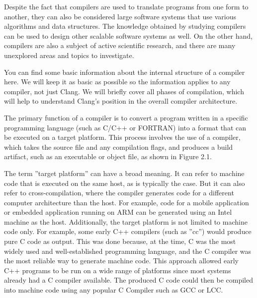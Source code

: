 Despite the fact that compilers are used to translate programs from one form to another, they can also be considered large software systems that use various algorithms and data structures. The knowledge obtained by studying compilers can be used to design other scalable software systems as well. On the other hand, compilers are also a subject of active scientific research, and there are many unexplored areas and topics to investigate.

You can find some basic information about the internal structure of a compiler here. We will keep it as basic as possible so the information applies to any compiler, not just Clang. We will briefly cover all phases of compilation, which will help to understand Clang’s position in the overall compiler architecture.


The primary function of a compiler is to convert a program written in a specific programming language (such as C/C++ or FORTRAN) into a format that can be executed on a target platform. This process involves the use of a compiler, which takes the source file and any compilation flags, and produces a build artifact, such as an executable or object file, as shown in Figure 2.1.


The term ”target platform” can have a broad meaning. It can refer to machine code that is executed on the same host, as is typically the case. But it can also refer to cross-compilation, where the compiler generates code for a different computer architecture than the host. For example, code for a mobile application or embedded application running on ARM can be generated using an Intel machine as the host. Additionally, the target platform is not limited to machine code only. For example, some early C++ compilers (such as ”cc”) would produce pure C code as output. This was done because, at the time, C was the most widely used and well-established programming language, and the C compiler was the most reliable way to generate machine code. This approach allowed early C++ programs to be run on a wide range of platforms since most systems already had a C compiler available. The produced C code could then be compiled into machine code using any popular C Compiler such as GCC or LCC.


